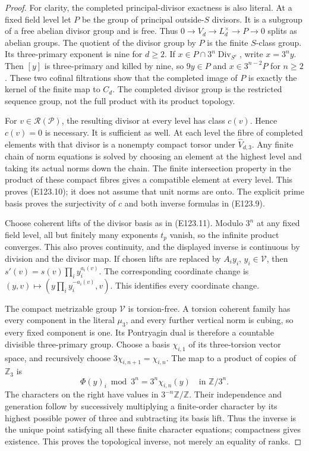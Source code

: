 \begin{proof}
For clarity, the completed principal-divisor exactness is also
literal. At a fixed field level let $P$ be the group of principal
outside-$S$ divisors. It is a subgroup of a free abelian divisor
group and is free. Thus
$0\to V_d\to L_d^\times\to P\to0$ splits as abelian groups.
The quotient of the divisor group by $P$ is the finite
$S$-class group. Its three-primary exponent is nine for $d\ge2$.
If $x\in P\cap3^n\operatorname{Div}_{S^c}$, write $x=3^ny$.
Then $[y]$ is three-primary and killed by nine, so
$9y\in P$ and $x\in3^{n-2}P$ for $n\ge2$.
These two cofinal filtrations show that the completed image of
$P$ is exactly the kernel of the finite map to $C_d$.
The completed divisor group is the restricted sequence group,
not the full product with its product topology.

For $v\in\mathcal R(\mathcal P)$, the resulting divisor at every
level has class $c(v)$. Hence $c(v)=0$ is necessary.
It is sufficient as well. At each level the fibre of completed
elements with that divisor is a nonempty compact torsor under
$\widehat V_{d,3}$. Any finite chain of norm equations is solved
by choosing an element at the highest level and taking its
actual norms down the chain. The finite intersection property
in the product of these compact fibres gives a compatible
element at every level. This proves (E123.10); it does not
assume that unit norms are onto.
The explicit prime basis proves the surjectivity of $c$ and
both inverse formulas in (E123.9).

Choose coherent lifts of the divisor basis as in (E123.11).
Modulo $3^n$ at any fixed field level, all but finitely many
exponents $t_p$ vanish, so the infinite product converges.
This also proves continuity, and the displayed inverse is
continuous by division and the divisor map.
If chosen lifts are replaced by $A_i y_i$, $y_i\in\mathcal V$,
then $s'(v)=s(v)\prod_i y_i^{a_i(v)}$.
The corresponding coordinate change is
$(y,v)\mapsto(y\prod_i y_i^{-a_i(v)},v)$.
This identifies every coordinate change.

The compact metrizable group $\mathcal V$ is torsion-free.
A torsion coherent family has every component in the literal
$\mu_3$, and every further vertical norm is cubing, so every
fixed component is one. Its Pontryagin dual is therefore a
countable divisible three-primary group.
Choose a basis $\chi_{i,1}$ of its three-torsion vector space,
and recursively choose $3\chi_{i,n+1}=\chi_{i,n}$.
The map to a product of copies of $\mathbb Z_3$ is
\[
       \Phi(y)_i\bmod3^n=3^n\chi_{i,n}(y)
                    \quad\text{in }\mathbb Z/3^n.
 \tag{E123.25}
\]
The characters on the right have values in
$3^{-n}\mathbb Z/\mathbb Z$. Their independence and generation
follow by successively multiplying a finite-order character
by its highest possible power of three and subtracting its
basis lift. Thus the inverse is the unique point satisfying
all these finite character equations; compactness gives
existence. This proves the topological inverse, not merely
an equality of ranks.


\end{proof}
